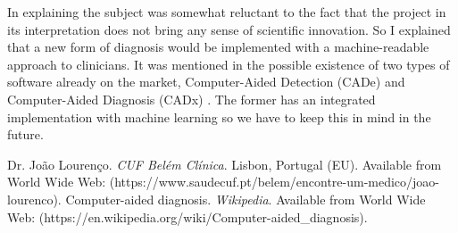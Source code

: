 \documentclass[a4paper, 11pt]{article}
\begin{document}
In explaining the subject was somewhat reluctant to the fact that the project in its interpretation does not bring any sense of scientific innovation. So I explained that a new form of diagnosis would be implemented with a machine-readable approach to clinicians. It was mentioned in the possible existence of two types of software already on the market, Computer-Aided Detection (CADe) and Computer-Aided Diagnosis (CADx) \cite{computerAidedDiagnosis}. The former has an integrated implementation with machine learning so we have to keep this in mind in the future.



\begin{thebibliography}{9}
  Dr. Jo\~{a}o Louren\c{c}o. \emph{CUF Bel\'{e}m Cl\'{i}nica}. Lisbon, Portugal (EU). Available from World Wide Web: (https://www.saudecuf.pt/belem/encontre-um-medico/joao-lourenco).
  Computer-aided diagnosis. \emph{Wikipedia}. Available from World Wide Web: (https://en.wikipedia.org/wiki/Computer-aided\_diagnosis).
\end{thebibliography}
\end{document}
